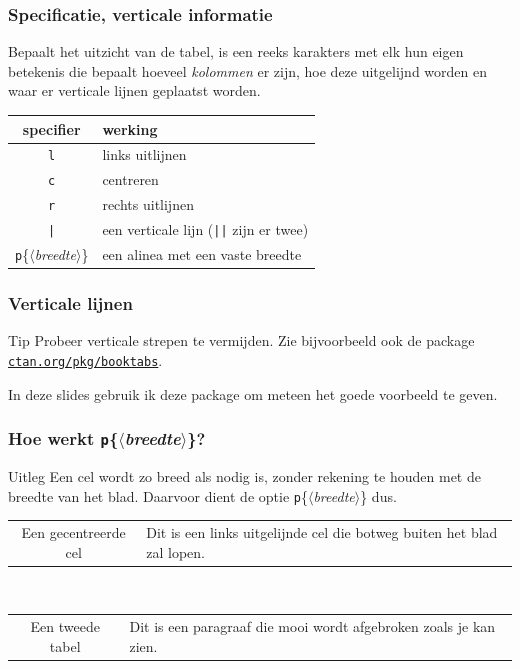 \begin{frame}
  \frametitle{Specificatie, verticale informatie}

  Bepaalt het uitzicht van de tabel, is een reeks karakters met elk hun eigen betekenis die bepaalt hoeveel \emph{kolommen} er zijn, hoe deze uitgelijnd worden en waar er verticale lijnen geplaatst worden. \\[1em]

  \begin{tabular}{cl}
    specifier & werking \\\midrule
    \texttt{l} & links uitlijnen \\
    \texttt{c} & centreren \\
    \texttt{r} & rechts uitlijnen \\
    \texttt{|} & een verticale lijn (\texttt{||} zijn er twee) \\
    \texttt{p}\{$\langle$\textsl{breedte}$\rangle$\} & een alinea met een vaste breedte
  \end{tabular}
\end{frame}

\begin{frame}
  \frametitle{Verticale lijnen}

  \begin{alertblock}{Tip}
    Probeer verticale strepen te vermijden. Zie bijvoorbeeld ook de package \href{http://ctan.org/pkg/booktabs}{\texttt{ctan.org/pkg/booktabs}}.
  \end{alertblock}

  In deze slides gebruik ik deze package om meteen het goede voorbeeld te geven.
\end{frame}

\begin{frame}
  \frametitle{Hoe werkt \texttt{p}\{$\langle$\textsl{breedte}$\rangle$\}?}

  \begin{exampleblock}{Uitleg}
  Een cel wordt zo breed als nodig is, zonder rekening te houden met de breedte van het blad. Daarvoor dient de optie \texttt{p}\{$\langle$\textsl{breedte}$\rangle$\} dus.
\end{exampleblock}

  \begin{tabular}{cl}
    Een gecentreerde cel & Dit is een links uitgelijnde cel die botweg buiten het blad zal lopen. \\
  \end{tabular} \\[1em]
  \begin{tabular}{cp{}}
    Een tweede tabel & Dit is een paragraaf die mooi wordt afgebroken zoals je kan zien. \\
  \end{tabular}
\end{frame}


